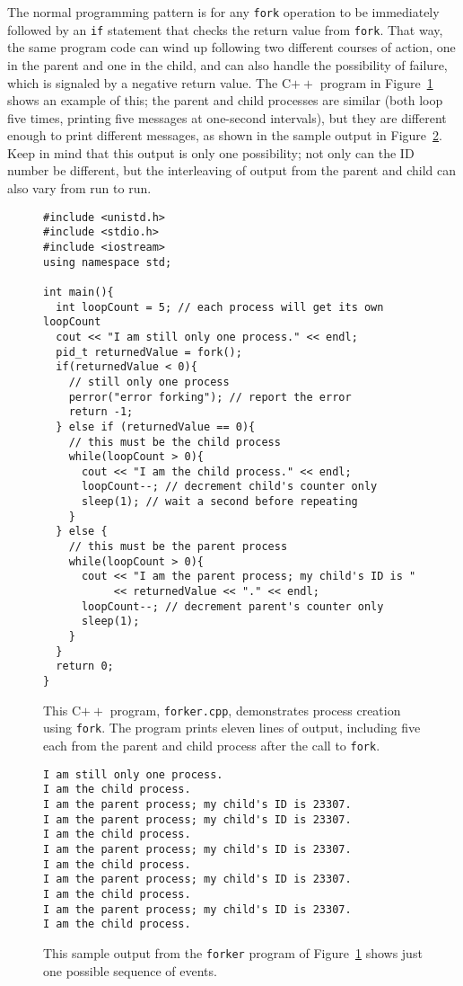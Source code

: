 The normal programming pattern is for any {\tt fork} operation to be
immediately followed by  an \verb|if| statement that checks
the return value from \verb|fork|.  That way, the same program code can wind up
following two different courses of action, one in the parent and one
in the child, and can also handle the possibility of failure, which is
signaled by a negative return value.
The C$++$ program in Figure~\ref{forker-code} shows an example of this;
the parent and child processes are similar (both loop five times,
printing five messages at one-second intervals), but they are
different enough to print different messages, as shown in the sample
output in Figure~\ref{forker-output}.  Keep in mind that this output
is only one possibility; not only can the ID number be different, but the
interleaving of output from the parent and child can also vary from
run to run.
\begin{figure}
\begin{verbatim}
#include <unistd.h>
#include <stdio.h>
#include <iostream>
using namespace std;

int main(){
  int loopCount = 5; // each process will get its own loopCount
  cout << "I am still only one process." << endl;
  pid_t returnedValue = fork();
  if(returnedValue < 0){
    // still only one process
    perror("error forking"); // report the error
    return -1;
  } else if (returnedValue == 0){
    // this must be the child process
    while(loopCount > 0){
      cout << "I am the child process." << endl;
      loopCount--; // decrement child's counter only
      sleep(1); // wait a second before repeating
    }
  } else {
    // this must be the parent process
    while(loopCount > 0){
      cout << "I am the parent process; my child's ID is "
           << returnedValue << "." << endl;
      loopCount--; // decrement parent's counter only
      sleep(1);
    }
  }
  return 0;
}
\end{verbatim}
\caption{This C$++$ program, {\tt forker.cpp}, demonstrates process
  creation using {\tt fork}.  The program prints eleven lines of output,
  including five each from the parent and child process after the call
  to {\tt fork}.}
\label{forker-code}
\end{figure}
\begin{figure}
\begin{verbatim}
I am still only one process.
I am the child process.
I am the parent process; my child's ID is 23307.
I am the parent process; my child's ID is 23307.
I am the child process.
I am the parent process; my child's ID is 23307.
I am the child process.
I am the parent process; my child's ID is 23307.
I am the child process.
I am the parent process; my child's ID is 23307.
I am the child process.
\end{verbatim}
\caption{This sample output from the {\tt forker} program of
  Figure~\ref{forker-code} shows just one possible sequence of
  events.}
\label{forker-output}
\end{figure}
